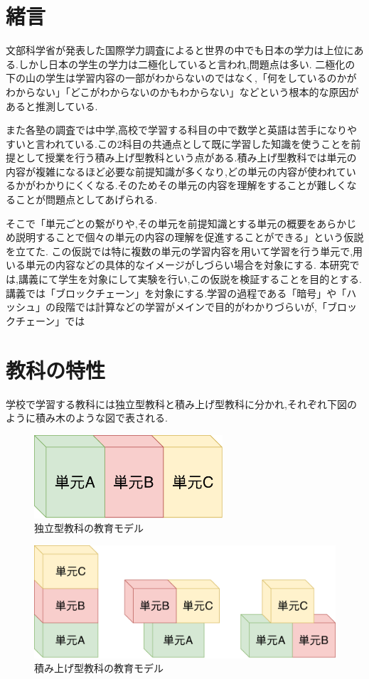 \documentclass[a4j,12pt]{jsarticle}
\begin{document}

\semi

\section{緒言}
文部科学省が発表した国際学力調査によると世界の中でも日本の学力は上位にある.しかし日本の学生の学力は二極化していると言われ,問題点は多い.
二極化の下の山の学生は学習内容の一部がわからないのではなく,「何をしているのかがわからない」「どこがわからないのかもわからない」などという根本的な原因があると推測している.

また各塾の調査では中学,高校で学習する科目の中で数学と英語は苦手になりやすいと言われている.この2科目の共通点として既に学習した知識を使うことを前提として授業を行う積み上げ型教科という点がある.積み上げ型教科では単元の内容が複雑になるほど必要な前提知識が多くなり,どの単元の内容が使われているかがわかりにくくなる.そのためその単元の内容を理解をすることが難しくなることが問題点としてあげられる.

そこで「単元ごとの繋がりや,その単元を前提知識とする単元の概要をあらかじめ説明することで個々の単元の内容の理解を促進することができる」という仮説を立てた.
この仮説では特に複数の単元の学習内容を用いて学習を行う単元で,用いる単元の内容などの具体的なイメージがしづらい場合を対象にする.
本研究では,講義にて学生を対象にして実験を行い,この仮説を検証することを目的とする.
講義では「ブロックチェーン」を対象にする.学習の過程である「暗号」や「ハッシュ」の段階では計算などの学習がメインで目的がわかりづらいが,「ブロックチェーン」では


\section{教科の特性}
学校で学習する教科には独立型教科と積み上げ型教科に分かれ,それぞれ下図のように積み木のような図で表される.

\begin{figure}[H]
\centering
\includegraphics[width=7cm]{02.pdf}
\caption{独立型教科の教育モデル}
\label{fig:02}
\end{figure} 

\begin{figure}[H]
\centering
\includegraphics[width=12cm]{03.pdf}
\caption{積み上げ型教科の教育モデル}
\label{fig:03}
\end{figure} 
\end{document}
